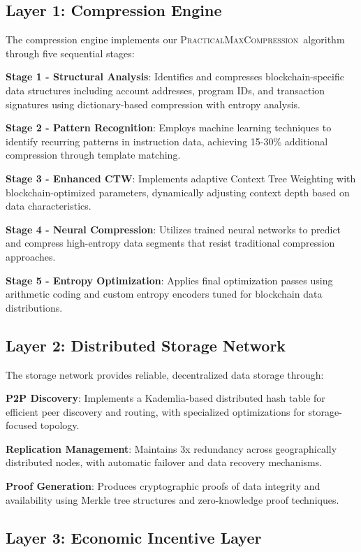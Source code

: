 \documentclass[11pt,a4paper]{article}
\newcommand{\PracticalMax}{\textsc{PracticalMaxCompression}}
\begin{document}
\subsection{Layer 1: Compression Engine}

The compression engine implements our \PracticalMax\ algorithm through five sequential stages:

\textbf{Stage 1 - Structural Analysis}: Identifies and compresses blockchain-specific data structures including account addresses, program IDs, and transaction signatures using dictionary-based compression with entropy analysis.

\textbf{Stage 2 - Pattern Recognition}: Employs machine learning techniques to identify recurring patterns in instruction data, achieving 15-30\% additional compression through template matching.

\textbf{Stage 3 - Enhanced CTW}: Implements adaptive Context Tree Weighting with blockchain-optimized parameters, dynamically adjusting context depth based on data characteristics.

\textbf{Stage 4 - Neural Compression}: Utilizes trained neural networks to predict and compress high-entropy data segments that resist traditional compression approaches.

\textbf{Stage 5 - Entropy Optimization}: Applies final optimization passes using arithmetic coding and custom entropy encoders tuned for blockchain data distributions.

\subsection{Layer 2: Distributed Storage Network}

The storage network provides reliable, decentralized data storage through:

\textbf{P2P Discovery}: Implements a Kademlia-based distributed hash table for efficient peer discovery and routing, with specialized optimizations for storage-focused topology.

\textbf{Replication Management}: Maintains 3x redundancy across geographically distributed nodes, with automatic failover and data recovery mechanisms.

\textbf{Proof Generation}: Produces cryptographic proofs of data integrity and availability using Merkle tree structures and zero-knowledge proof techniques.

\subsection{Layer 3: Economic Incentive Layer}
\end{document}

